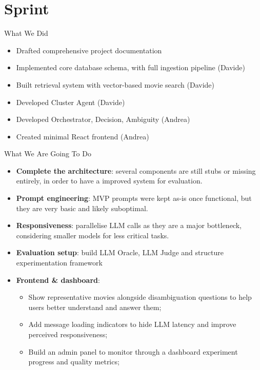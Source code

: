 \section{Sprint}

\begin{frame}{What We Did}
  \begin{itemize}
    \item Drafted comprehensive project documentation
    \item Implemented core database schema, with full ingestion pipeline (Davide)
    \item Built retrieval system with vector-based movie search (Davide)
    \item Developed Cluster Agent (Davide)
    \item Developed Orchestrator, Decision, Ambiguity (Andrea)
    \item Created minimal React frontend (Andrea)
  \end{itemize}
\end{frame}

\begin{frame}{What We Are Going To Do}
  \begin{itemize}
    \item \textbf{Complete the architecture}: several components are still stubs or missing entirely, in order to have a improved system for evaluation.
    \item \textbf{Prompt engineering}: MVP prompts were kept as-is once functional, but they are very basic and likely suboptimal. 
    \item \textbf{Responsiveness}: parallelise LLM calls as they are a major bottleneck, considering smaller models for less critical tasks.
    \item \textbf{Evaluation setup}: build LLM Oracle, LLM Judge and structure experimentation framework
    \item \textbf{Frontend \& dashboard}:
            \begin{itemize}
                \item Show representative movies alongside disambiguation questions to help users better understand and answer them;
                \item Add message loading indicators to hide LLM latency and improve perceived responsiveness;
                \item Build an admin panel to monitor through a dashboard experiment progress and quality metrics;
            \end{itemize}
  \end{itemize}
\end{frame}